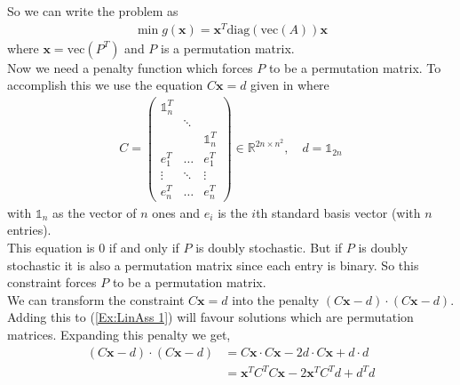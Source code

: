 \documentclass{article}
\begin{document}
\noindent So we can write the problem as 
\begin{align} \label{Ex:LinAss 1}
    \min g(\mathbf{x}) = \mathbf{x}^T \text{diag}(\text{vec}(A)) \mathbf{x}
\end{align}
where \(\mathbf{x} = \text{vec}(P^T)\) and \(P\) is a permutation matrix.\\

\noindent Now we need a penalty function which forces \(P\) to be a permutation matrix. To accomplish this we use the equation \(C\mathbf{x} = d\) given in \cite[p.~8]{klus2023continuous} where 
\begin{align}\label{mat:CD}
    C = \begin{pmatrix}
        \mathbb{1}_n^T & & \\
         & \ddots & \\ 
         & & \mathbb{1}_n^T \\
         e_1^T & \hdots & e_1^T \\
         \vdots & \ddots & \vdots \\
         e_n^T & \hdots & e_n^T
    \end{pmatrix} \in \mathbb{R}^{2n \times n^2}, \quad d = \mathbb{1}_{2n}
\end{align}
with \(\mathbb{1}_n\) as the vector of \(n\) ones and \(e_i\) is the \(i\)th standard basis vector (with \(n\) entries). \\

\noindent This equation is 0 if and only if \(P\) is doubly stochastic. But if \(P\) is doubly stochastic it is also a permutation matrix since each entry is binary. So this constraint forces \(P\) to be a permutation matrix.\\

\noindent We can transform the constraint \(C\mathbf{x} = d\) into the penalty \((C\mathbf{x} - d) \cdot (C\mathbf{x} - d)\). Adding this to (\ref{Ex:LinAss 1}) will favour solutions which are  permutation matrices.
Expanding this penalty we get,
\begin{align*}
    (C\mathbf{x} - d) \cdot (C\mathbf{x} - d) &= C\mathbf{x} \cdot C\mathbf{x} - 2d\cdot C\mathbf{x} + d \cdot d \\
    &= \mathbf{x}^T C^T C \mathbf{x} -2\mathbf{x}^T C^T d + d^Td
\end{align*}
\end{document}
